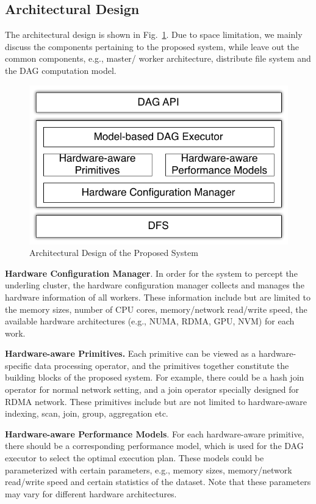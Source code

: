\documentclass[conference]{llncs}
\newcommand{\reffigure}[1]{Fig.~\ref{#1}}
\begin{document}
\subsection{Architectural Design}
The architectural design is shown in \reffigure{fig:architecture}. Due to space limitation, we mainly discuss the components pertaining to the proposed system, while leave out the common components, e.g., master/ worker architecture, distribute file system and the DAG computation model.


\begin{figure}[t]
\centering
\includegraphics[width=0.45\linewidth]{architecture.pdf}
\caption{Architectural Design of the Proposed System}
\label{fig:architecture}
\end{figure}

\textbf{Hardware Configuration Manager}.
In order for the system to percept the underling cluster, the hardware configuration manager collects and manages the hardware information of all workers.
These information include but are limited to the memory sizes, number of CPU cores, memory/network read/write speed, the available hardware architectures (e.g., NUMA, RDMA, GPU, NVM) for each work.

\textbf{Hardware-aware Primitives.}
Each primitive can be viewed as a hardware-specific data processing operator, and the primitives together constitute the building blocks of the proposed system.
For example, there could be a hash join operator for normal network setting, and a join operator specially designed for RDMA network. 
These primitives include but are not limited to hardware-aware indexing, scan, join, group, aggregation etc.

\textbf{Hardware-aware Performance Models}.
For each hardware-aware primitive, there should be a corresponding performance model, which is used for the DAG executor to select the optimal execution plan.
These models could be parameterized with certain parameters, e.g., memory sizes, memory/network read/write speed and certain statistics of the dataset.
Note that these parameters may vary for different hardware architectures.
\end{document}
